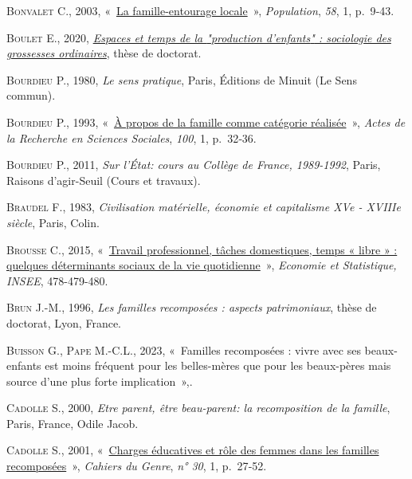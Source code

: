 \documentclass[
  12pt,
]{book}
\newlength{\cslhangindent}
\newenvironment{CSLReferences}[2] %
 {\begin{list}{}{%
  \setlength{\itemindent}{0pt}
  \setlength{\leftmargin}{0pt}
  \setlength{\parsep}{0pt}
  \ifodd #1
   \setlength{\leftmargin}{\cslhangindent}
   \setlength{\itemindent}{-1\cslhangindent}
  \fi
  \setlength{\itemsep}{#2\baselineskip}}}
 {\end{list}}
\begin{document}
\begin{CSLReferences}{0}{1}
\textsc{Bonvalet C.}, 2003,
{«~\href{https://doi.org/10.3917/popu.301.0009}{La famille-entourage
locale}~»}, \emph{Population}, \emph{58}, 1, p.~9‑43.

\textsc{Boulet E.}, 2020,
\emph{\href{https://theses.fr/2020LYSE2034}{Espaces et temps de la
{"}production d'enfants{"} : sociologie des grossesses ordinaires}},
thèse de doctorat.

\textsc{Bourdieu P.}, 1980, \emph{Le sens pratique}, Paris, Éditions de
Minuit (Le Sens commun).

\textsc{Bourdieu P.}, 1993,
{«~\href{https://doi.org/10.3406/arss.1993.3070}{À propos de la famille
comme catégorie réalisée}~»}, \emph{Actes de la Recherche en Sciences
Sociales}, \emph{100}, 1, p.~32‑36.

\textsc{Bourdieu P.}, 2011, \emph{Sur l'État: cours au Collège de
France, 1989-1992}, Paris, Raisons d'agir-Seuil (Cours et travaux).

\textsc{Braudel F.}, 1983, \emph{Civilisation matérielle, économie et
capitalisme XVe - XVIIIe siècle}, Paris, Colin.

\textsc{Brousse C.}, 2015,
{«~\href{https://www.insee.fr/fr/statistiques/1303226?sommaire=1303240}{Travail
professionnel, tâches domestiques, temps « libre » : quelques
déterminants sociaux de la vie quotidienne}~»}, \emph{Economie et
Statistique, INSEE}, 478-479-480.

\textsc{Brun J.-M.}, 1996, \emph{Les familles recomposées : aspects
patrimoniaux}, thèse de doctorat, Lyon, France.

\textsc{Buisson G.}, \textsc{Pape M.-C.L.}, 2023, {«~Familles
recomposées : vivre avec ses beaux-enfants est moins fréquent pour les
belles-mères que pour les beaux-pères mais source d{'}une plus forte
implication~»},.

\textsc{Cadolle S.}, 2000, \emph{Etre parent, être beau-parent: la
recomposition de la famille}, Paris, France, Odile Jacob.

\textsc{Cadolle S.}, 2001,
{«~\href{http://www.cairn.info/revue-cahiers-du-genre-2001-1-page-27.htm}{Charges
éducatives et rôle des femmes dans les familles recomposées}~»},
\emph{Cahiers du Genre}, \emph{n° 30}, 1, p.~27‑52.


\end{CSLReferences}
\end{document}
